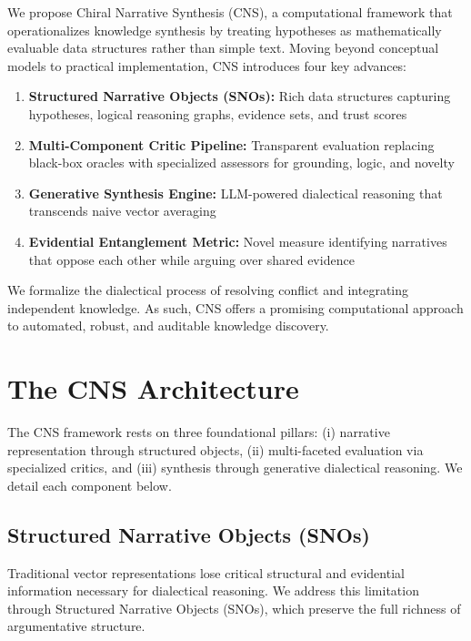 \documentclass[12pt, a4paper]{article}
\begin{document}
We propose Chiral Narrative Synthesis (CNS), a computational framework that operationalizes knowledge synthesis by treating hypotheses as mathematically evaluable data structures rather than simple text. Moving beyond conceptual models to practical implementation, CNS introduces four key advances:
\begin{enumerate}
    \item \textbf{Structured Narrative Objects (SNOs):} Rich data structures capturing hypotheses, logical reasoning graphs, evidence sets, and trust scores
    \item \textbf{Multi-Component Critic Pipeline:} Transparent evaluation replacing black-box oracles with specialized assessors for grounding, logic, and novelty
    \item \textbf{Generative Synthesis Engine:} LLM-powered dialectical reasoning that transcends naive vector averaging
    \item \textbf{Evidential Entanglement Metric:} Novel measure identifying narratives that oppose each other while arguing over shared evidence
\end{enumerate}

We formalize the dialectical process of resolving conflict and integrating independent knowledge. As such, CNS offers a promising computational approach to automated, robust, and auditable knowledge discovery.

\section{The CNS Architecture}
The CNS framework rests on three foundational pillars: (i) narrative representation through structured objects, (ii) multi-faceted evaluation via specialized critics, and (iii) synthesis through generative dialectical reasoning. We detail each component below.

\subsection{Structured Narrative Objects (SNOs)}
Traditional vector representations lose critical structural and evidential information necessary for dialectical reasoning. We address this limitation through Structured Narrative Objects (SNOs), which preserve the full richness of argumentative structure.
\end{document}
